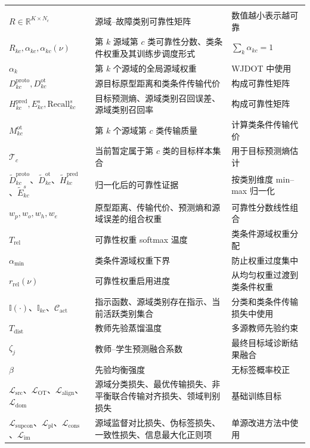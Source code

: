 \documentclass{seuthesis-2022}
\begin{document}
{\begin{longtable}{@{}>{\raggedright\arraybackslash}p{}>{\raggedright\arraybackslash}p{}>{\raggedright\arraybackslash}p{}@{}}
    \addlinespace
    \multicolumn{3}{l}{\textbf{多源可靠性与损失函数}}\\
    \addlinespace
    $R\in\mathbb{R}^{K\times N_c}$ & 源域--故障类别可靠性矩阵 & 数值越小表示越可靠 \\
    $R_{kc},\alpha_{kc},\alpha_{kc}(\nu)$ & 第 $k$ 源域第 $c$ 类可靠性分数、类条件权重及其训练步调度形式 & $\sum_k\alpha_{kc}=1$ \\
    $\alpha_k$ & 第 $k$ 个源域的全局源域权重 & WJDOT 中使用 \\
    $D_{kc}^{\mathrm{proto}},D_{kc}^{\mathrm{ot}}$ & 源目标原型距离和类条件传输代价 & 构成可靠性矩阵 \\
    $H_{kc}^{\mathrm{pred}},E_{kc}^{s},\mathrm{Recall}_{kc}^{s}$ & 目标预测熵、源域类别召回误差、源域类别召回率 & 构成可靠性矩阵 \\
    $M_{kc}^{\mathrm{ot}}$ & 第 $k$ 个源域第 $c$ 类传输质量 & 计算类条件传输代价 \\
    $\mathcal{T}_c$ & 当前暂定属于第 $c$ 类的目标样本集合 & 用于目标预测熵估计 \\
    $\widetilde{D}_{kc}^{\mathrm{proto}}$、$\widetilde{D}_{kc}^{\mathrm{ot}}$、$\widetilde{H}_{kc}^{\mathrm{pred}}$、$\widetilde{E}_{kc}^{s}$ & 归一化后的可靠性证据 & 按类别维度 min--max 归一化 \\
    $w_p,w_o,w_h,w_e$ & 原型距离、传输代价、预测熵和源域误差的组合权重 & 可靠性分数线性组合 \\
    $T_{\mathrm{rel}}$ & 可靠性权重 softmax 温度 & 类条件源域权重分配 \\
    $\alpha_{\min}$ & 类条件源域权重下界 & 防止权重过度集中 \\
    $r_{\mathrm{rel}}(\nu)$ & 可靠性权重启用进度 & 从均匀权重过渡到类条件权重 \\
    $\mathbb{I}(\cdot)$、$\mathbb{I}_{kc}$、$\mathcal{C}_{\mathrm{act}}$ & 指示函数、源域类别存在指示、当前活跃类别集合 & 分类和类条件传输损失中使用 \\
    $T_{\mathrm{dist}}$ & 教师先验蒸馏温度 & 多源教师先验约束 \\
    $\zeta_j$ & 教师--学生预测融合系数 & 最终目标域诊断结果融合 \\
    $\beta$ & 先验均衡强度 & 无标签概率校正 \\
    $\mathcal{L}_{\mathrm{src}}$、$\mathcal{L}_{\mathrm{OT}}$、$\mathcal{L}_{\mathrm{align}}$、$\mathcal{L}_{\mathrm{dom}}$ & 源域分类损失、最优传输损失、非平衡联合传输对齐损失、领域判别损失 & 基础训练目标 \\
    $\mathcal{L}_{\mathrm{supcon}}$、$\mathcal{L}_{\mathrm{pl}}$、$\mathcal{L}_{\mathrm{cons}}$、$\mathcal{L}_{\mathrm{im}}$ & 源域监督对比损失、伪标签损失、一致性损失、信息最大化正则项 & 单源改进方法中使用 \\

\end{longtable}}
\end{document}

